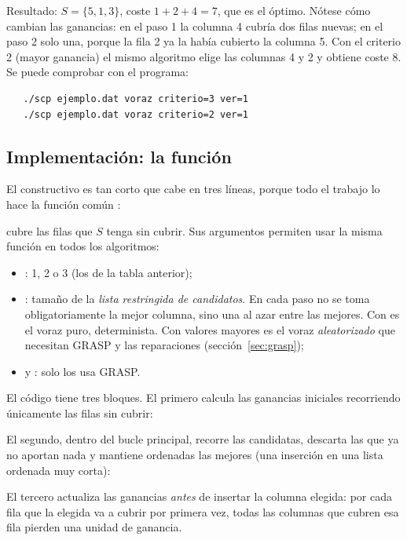 Resultado: $S=\{5,1,3\}$, coste $1+2+4=7$, que es el óptimo. Nótese cómo cambian las
ganancias: en el paso 1 la columna 4 cubría dos filas nuevas; en el paso 2 solo una, porque
la fila 2 ya la había cubierto la columna 5. Con el criterio 2 (mayor ganancia) el mismo
algoritmo elige las columnas 4 y 2 y obtiene coste 8. Se puede comprobar con el programa:
\begin{verbatim}
   ./scp ejemplo.dat voraz criterio=3 ver=1
   ./scp ejemplo.dat voraz criterio=2 ver=1
\end{verbatim}

\subsection{Implementación: la función }\label{sec:completar}

El constructivo es tan corto que cabe en tres líneas, porque todo el trabajo lo hace la
función común :


 cubre las filas que $S$ tenga sin
cubrir. Sus argumentos permiten usar la misma función en todos los algoritmos:
\begin{itemize}
  \item {}: 1, 2 o 3 (los de la tabla anterior);
  \item {}: tamaño de la \emph{lista restringida de candidatos}. En cada paso no se
        toma obligatoriamente la mejor columna, sino una al azar entre las  mejores.
        Con  es el voraz puro, determinista. Con valores mayores es el voraz
        \emph{aleatorizado} que necesitan GRASP y las reparaciones (sección~\ref{sec:grasp});
  \item {} y : solo los usa GRASP.
\end{itemize}

El código tiene tres bloques. El primero calcula las ganancias iniciales recorriendo
únicamente las filas sin cubrir:


El segundo, dentro del bucle principal, recorre las candidatas, descarta las que ya no
aportan nada y mantiene ordenadas las  mejores (una inserción en una lista ordenada
muy corta):


El tercero actualiza las ganancias \emph{antes} de insertar la columna elegida: por cada fila
que la elegida va a cubrir por primera vez, todas las columnas que cubren esa fila pierden
una unidad de ganancia.


